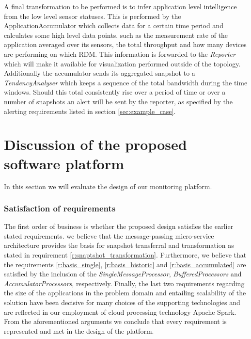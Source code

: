 A final transformation to be performed is to infer application level intelligence from the low level sensor statuses. This is performed by the ApplicationAccumulator which collects data for a certain time period and calculates some high level data points, such as the measurement rate of the application averaged over its sensors, the total throughput and how many devices are performing on which RDM. This information is forwarded to the \emph{Reporter} which will make it available for visualization performed outside of the topology. Additionally the accumulator sends its aggregated snapshot to a \emph{TendencyAnalyser} which keeps a sequence of the total bandwidth during the time windows. Should this total consistently rise over a period of time or over a number of snapshots an alert will be sent by the reporter, as specified by the alerting requirements listed in section \ref{sec:example_case}.
	
\section{Discussion of the proposed software platform}
In this section we will evaluate the design of our monitoring platform. 

\subsubsection*{Satisfaction of requirements}
The first order of business is whether the proposed design satisfies the earlier stated requirements. we believe that the message-passing micro-service architecture provides the basis for snapshot transferral and transformation as stated in requirement \ref{r:snaptshot_transformation}. Furthermore, we believe that the requirements \ref{r:basis_single}, \ref{r:basis_historic} and \ref{r:basis_accumulated} are satisfied by the inclusion of the \emph{SingleMessageProcessor}, \emph{BufferedProcessors} and \emph{AccumulatorProcessors}, respectively. Finally, the last two requirements regarding the size of the applications in the problem domain and entailing scalability of the solution have been decisive for many choices of the supporting technologies and are reflected in our employment of cloud processing technology Apache Spark. From the aforementioned arguments we conclude that every requirement is represented and met in the design of the platform.

